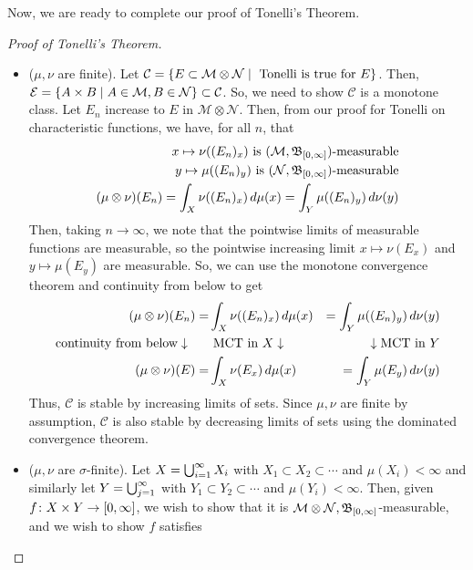 \documentclass[11pt,leqno,oneside]{amsbook}
\numberwithin{thm}{section}
\newcommand{\M}{\mathcal{M}} %
\newcommand{\Ep}{\mathcal{E}} %
\newcommand{\cN}{\mathcal{N}}
\newcommand{\cC}{\mathcal{C}} %
\newcommand{\s}{$\sigma$-} %
\newcommand{\ox}{\otimes}
\begin{document}
Now, we are ready to complete our proof of Tonelli's Theorem.
\begin{proof}[Proof of Tonelli's Theorem]
  \begin{itemize}
  \item (\(\mu, \nu\) are finite). Let \(\cC = \{E \subset \M \ox \cN
    \st \text{ Tonelli is true for }E\}\). Then, \(\Ep = \{A \times B
    \st A \in \M, B \in \cN\} \subset \cC\). So, we need to show
    \(\cC\) is a monotone class. Let \(E_n\) increase to \(E\) in \(\M
    \ox \cN\). Then, from our proof for Tonelli on characteristic
    functions, we have, for all \(n\), that
    \begin{align*}
      x \mapsto \nu((E_n)_x) \text{ is
      }(\M,\B_{[0,\infty]})\text{-measurable} \\
      y \mapsto \mu((E_n)_y) \text{ is
      }(\cN,\B_{[0,\infty]})\text{-measurable} \\
      (\mu \ox \nu)(E_n) = \int_X \nu((E_n)_x) \d\mu(x) = \int_Y
      \mu((E_n)_y) \d\nu(y)
    \end{align*}
    Then, taking \(n \to \infty\), we note that the pointwise limits of
    measurable functions are measurable, so the pointwise increasing
    limit \(x \mapsto \nu(E_x)\) and \(y \mapsto \mu(E_y)\) are
    measurable. So, we can use the
    monotone convergence theorem and continuity from below to get
    \begin{align*}
      (\mu \ox \nu)(E_n)
       = &\int_X \nu((E_n)_x) \d\mu(x)
      & = \int_Y \mu((E_n)_y) \d\nu(y) \\
      \text{continuity from below} \downarrow \ \ \ \ \   
      & \text{ MCT in }X \downarrow
      & \downarrow\text{MCT in }Y\\
      (\mu \ox \nu)(E) =
      & \int_X \nu(E_x) \d\mu(x)
      & = \int_Y \mu(E_y) \d\nu(y)
    \end{align*}
    Thus, \(\cC\) is stable by increasing limits of sets. Since
    \(\mu,\nu\) are finite by assumption, \(\cC\) is also stable by
    decreasing limits of sets using the dominated convergence theorem.
  \item (\(\mu,\nu\) are \s finite). Let \(X = \bigcup_{i=1}^\infty
    X_i\) with \(X_1 \subset X_2 \subset \cdots\) and \(\mu(X_i) <
    \infty\) and similarly let \(Y = \bigcup_{j=1}^\infty\) with \(Y_1
    \subset Y_2 \subset \cdots\) and \(\mu(Y_i) < \infty\). Then,
    given \(f \colon X \times Y \to [0,\infty]\), we wish to show that
    it is \(\M \ox \cN,
    \B_{[0,\infty]}\)-measurable, and we wish to show \(f\) satisfies

\end{itemize}
\end{proof}
\end{document}
